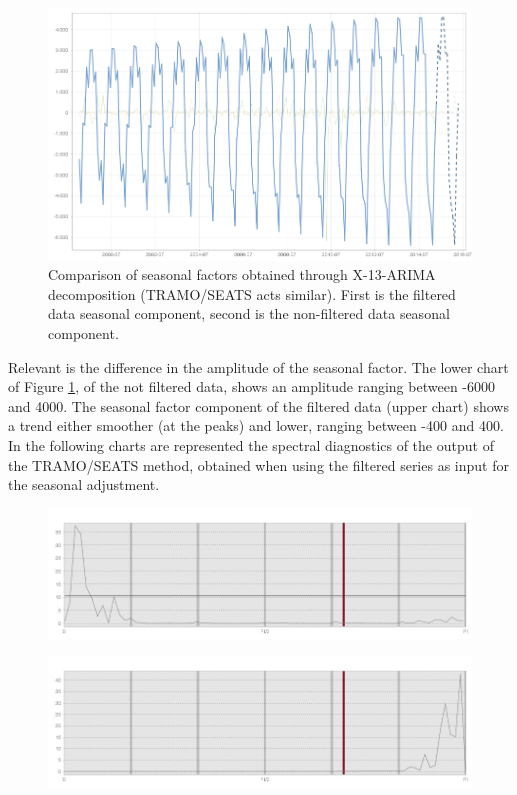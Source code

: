 \documentclass[english,blauw]{cbsdiscussionpaper}
\begin{document}
\begin{figure}[!h]
\includegraphics[width=\linewidth]{../images/capitolo4/X13_seas_cmp_plan.jpg}
\caption{Comparison of seasonal factors obtained through X-13-ARIMA decomposition (TRAMO/SEATS acts similar). First is the filtered data seasonal component, second is the non-filtered data seasonal component.}
\label{fig:X13_seas}
\end{figure}
Relevant is the difference in the amplitude of the seasonal factor. The lower chart of Figure \ref{fig:X13_seas}, of the not filtered data, shows an amplitude ranging between -6000 and 4000. The seasonal factor component of the filtered data (upper chart) shows a trend either smoother (at the peaks) and lower, ranging between -400 and 400.\\In the following charts are represented the spectral diagnostics of the output of the TRAMO/SEATS method, obtained when using the filtered series as input for the seasonal adjustment.
\begin{figure}[H]
\includegraphics[width=\linewidth]{../images/capitolo4/TSresper.jpg}
\end{figure}
\begin{figure}[H]
\includegraphics[width=\linewidth]{../images/capitolo4/TSirrper.jpg}
\end{figure}
\end{document}
